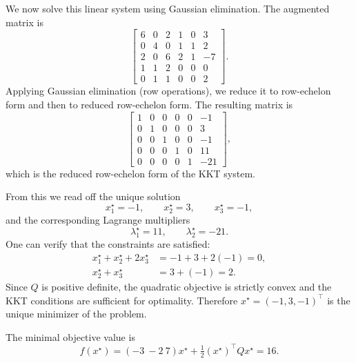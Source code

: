 \documentclass[11pt]{article}
\begin{document}
We now solve this linear system using Gaussian elimination.
The augmented matrix is
\begin{equation*}
\left[
\begin{array}{ccccc|c}
6 & 0 & 2 & 1 & 0 & 3\\
0 & 4 & 0 & 1 & 1 & 2\\
2 & 0 & 6 & 2 & 1 & -7\\
1 & 1 & 2 & 0 & 0 & 0\\
0 & 1 & 1 & 0 & 0 & 2
\end{array}
\right].
\end{equation*}
Applying Gaussian elimination (row operations), we reduce it to row-echelon form and then to reduced row-echelon form.
The resulting matrix is
\begin{equation*}
\left[
\begin{array}{ccccc|c}
1 & 0 & 0 & 0 & 0 & -1\\
0 & 1 & 0 & 0 & 0 & 3\\
0 & 0 & 1 & 0 & 0 & -1\\
0 & 0 & 0 & 1 & 0 & 11\\
0 & 0 & 0 & 0 & 1 & -21
\end{array}
\right],
\end{equation*}
which is the reduced row-echelon form of the KKT system.

From this we read off the unique solution
\begin{equation*}
x_1^\star = -1,\qquad x_2^\star = 3,\qquad x_3^\star = -1,
\end{equation*}
and the corresponding Lagrange multipliers
\begin{equation*}
\lambda_1^\star = 11,\qquad \lambda_2^\star = -21.
\end{equation*}
One can verify that the constraints are satisfied:
\begin{align*}
x_1^\star + x_2^\star + 2x_3^\star &= -1 + 3 + 2(-1) = 0,\\
x_2^\star + x_3^\star &= 3 + (-1) = 2.
\end{align*}
Since $Q$ is positive definite, the quadratic objective is strictly convex and the KKT conditions are sufficient for optimality. Therefore $x^\star = (-1,3,-1)^\top$ is the unique minimizer of the problem.

The minimal objective value is
\begin{equation*}
f(x^\star)
= (-3\ -2\ 7)x^\star + \tfrac12 (x^\star)^\top Q x^\star
= 16.
\end{equation*}
\end{document}

